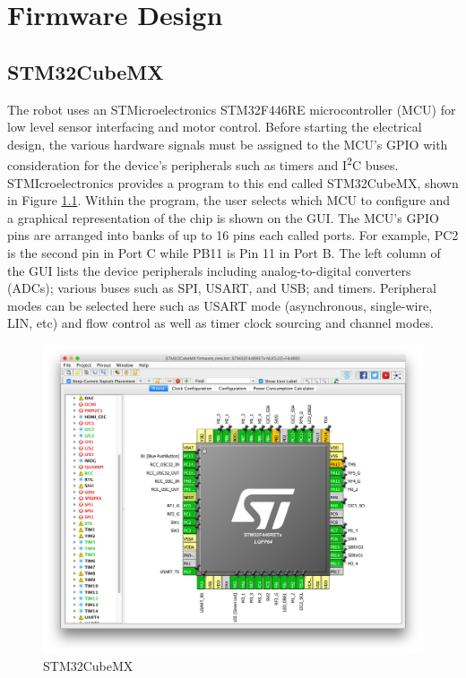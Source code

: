 \chapter{Firmware Design}
\section{STM32CubeMX}
The robot uses an STMicroelectronics STM32F446RE microcontroller (MCU) for low level sensor interfacing and motor control. Before starting the electrical design, the various hardware signals must be assigned to the MCU's GPIO with consideration for the device's peripherals such as timers and I\textsuperscript{2}C buses. STMIcroelectronics provides a program to this end called STM32CubeMX, shown in Figure \ref{fig:stm32cubemx}. Within the program, the user selects which MCU to configure and a graphical representation of the chip is shown on the GUI. The MCU's GPIO pins are arranged into banks of up to 16 pins each called ports. For example, PC2 is the second pin in Port C while PB11 is Pin 11 in Port B. The left column of the GUI lists the device peripherals including analog-to-digital converters (ADCs); various buses such as SPI, USART, and USB; and timers. Peripheral modes can be selected here such as USART mode (asynchronous, single-wire, LIN, etc) and flow control as well as timer clock sourcing and channel modes.

\begin{figure}[H]   %
	\centering \includegraphics[width=6in, keepaspectratio]{figures/stm32cubemx.png}
	\caption{STM32CubeMX}\label{fig:stm32cubemx}
\end{figure}

